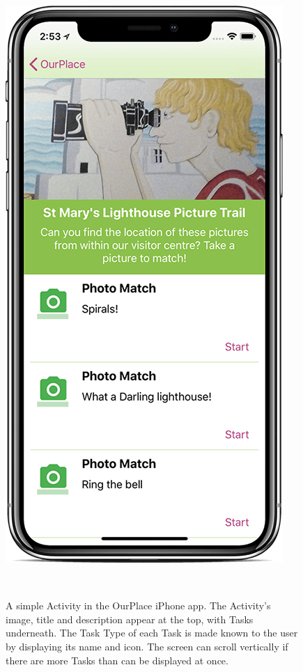 \begin{figure}
  \centering
  \includegraphics[width=0.85\columnwidth]{images/chapter05/activity.png}
  \caption[A simple OurPlace Activity]{ A simple Activity in the OurPlace iPhone app. The Activity's image, title and description appear at the top, with Tasks underneath. The Task Type of each Task is made known to the user by displaying its name and icon. The screen can scroll vertically if there are more Tasks than can be displayed at once. }~\label{fig:ActivityExample}
\end{figure}

